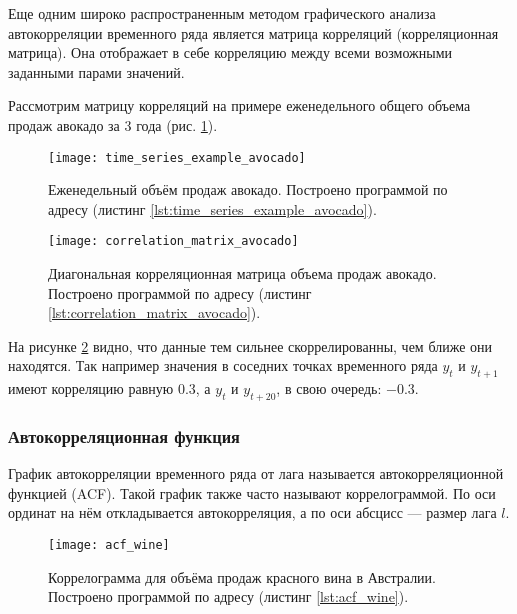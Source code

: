 Еще одним широко распространенным методом графического анализа автокорреляции 
временного ряда является матрица корреляций (корреляционная матрица). Она отображает в 
себе корреляцию между всеми возможными заданными парами значений.

Рассмотрим матрицу корреляций на примере еженедельного общего объема продаж авокадо 
за 3 года (рис. \ref{fig:time_series_avocado}).

\begin{figure}[h!]
    \centering
    \texttt{[image: time\_series\_example\_avocado]}
    \caption{Еженедельный объём продаж авокадо. Построено программой по адресу 
    (листинг \ref{lst:time_series_example_avocado}).}
    \label{fig:time_series_avocado}
\end{figure}

\begin{figure}[h!]
    \centering
    \texttt{[image: correlation\_matrix\_avocado]}
    \caption{Диагональная корреляционная матрица объема продаж авокадо. Построено 
    программой по адресу (листинг \ref{lst:correlation_matrix_avocado}).}
    \label{fig:correlation_matrix_avocado}
\end{figure}

\newpage

На рисунке \ref{fig:correlation_matrix_avocado} видно, что данные тем сильнее 
скоррелированны, чем ближе они находятся. Так например значения в соседних точках 
временного ряда $y_t$ и $y_{t+1}$ имеют корреляцию равную $0.3$, а $y_t$ и $y_{t+20}$, 
в свою очередь: $-0.3$.

\subsubsection{Автокорреляционная функция}

График автокорреляции временного ряда от лага называется автокорреляционной 
функцией (ACF). Такой график также часто называют коррелограммой. По оси ординат на 
нём откладывается автокорреляция, а по оси абсцисс — размер лага $l$.

\begin{figure}[h!]
    \centering
    \texttt{[image: acf\_wine]}
    \caption{Коррелограмма для объёма продаж красного вина в Австралии. Построено 
    программой по адресу (листинг \ref{lst:acf_wine}).}
    \label{fig:acf_wine}
\end{figure}


